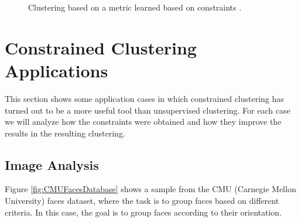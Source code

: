 \begin{figure}[bth]
	\myfloatalign
	\hspace{0.5cm}
	\caption[Clustering based on a metric learned from constraints.]{Clustering based on a metric learned based on constraints \cite{davidson2007survey}.} \label{fig:ConstrainsAndMetricLearned}
\end{figure}

\section{Constrained Clustering Applications} \label{sec:CCApplications}

This section shows some application cases in which constrained clustering has turned out to be a more useful tool than unsupervised clustering. For each case we will analyze how the constraints were obtained and how they improve the results in the resulting clustering. 

\subsection{Image Analysis}

Figure \ref{fig:CMUFacesDatabase} shows a sample from the CMU (Carnegie Mellon University) faces dataset, where the task is to group faces based on different criteria. In this case, the goal is to group faces according to their orientation.

